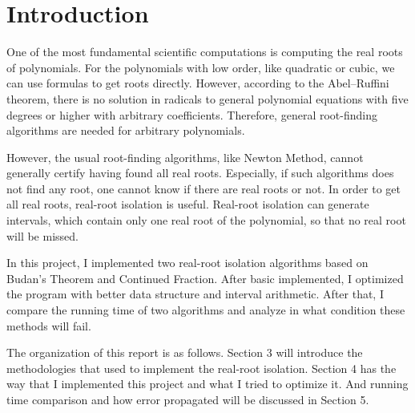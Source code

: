 \section{Introduction}

One of the most fundamental scientific computations is computing the real roots
of polynomials. For the polynomials with low order, like quadratic or cubic, we
can use formulas to get roots directly. However, according to the Abel–Ruffini
theorem\cite{Abel-Ruffini}, there is no solution in radicals to general
polynomial equations with five degrees or higher with arbitrary coefficients.
Therefore, general root-finding algorithms are needed for arbitrary polynomials.

However, the usual root-finding algorithms, like Newton Method, cannot generally
certify having found all real roots. Especially, if such algorithms does not
find any root, one cannot know if there are real roots or not. In order to get
all real roots, real-root isolation is useful. Real-root isolation can generate
intervals, which contain only one real root of the polynomial, so that no real
root will be missed.

In this project, I implemented two real-root isolation algorithms based on
Budan's Theorem\cite{Budan} and Continued Fraction. After basic implemented, I optimized the
program with better data structure and interval arithmetic. After that, I compare
the running time of two algorithms and analyze in what condition these methods will fail. 

The organization of this report is as follows. Section 3 will
introduce the methodologies that used to implement the real-root isolation.
Section 4 has the way that I implemented this project and what I tried to
optimize it. And running time comparison and how error propagated  
will be discussed in Section 5.

